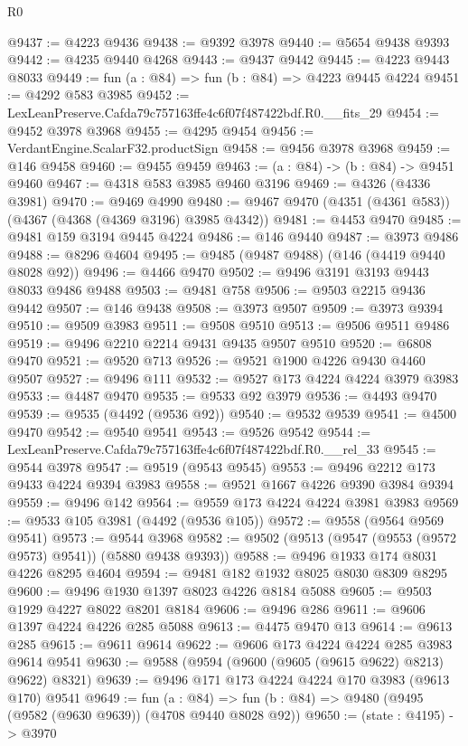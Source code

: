 \begin{lexlean}{R0}
\begin{coremodule}
@9437 := @4223 @9436
@9438 := @9392 @3978
@9440 := @5654 @9438 @9393
@9442 := @4235 @9440 @4268
@9443 := @9437 @9442
@9445 := @4223 @9443 @8033
@9449 := fun (a : @84) => fun (b : @84) => @4223 @9445 @4224
@9451 := @4292 @583 @3985
@9452 := LexLeanPreserve.Cafda79c757163ffe4c6f07f487422bdf.R0.__fits_29
@9454 := @9452 @3978 @3968
@9455 := @4295 @9454
@9456 := VerdantEngine.ScalarF32.productSign
@9458 := @9456 @3978 @3968
@9459 := @146 @9458
@9460 := @9455 @9459
@9463 := (a : @84) -> (b : @84) -> @9451 @9460
@9467 := @4318 @583 @3985 @9460 @3196
@9469 := @4326 (@4336 @3981)
@9470 := @9469 @4990
@9480 := @9467 @9470 (@4351 (@4361 @583)) (@4367 (@4368 (@4369 @3196) @3985 @4342))
@9481 := @4453 @9470
@9485 := @9481 @159 @3194 @9445 @4224
@9486 := @146 @9440
@9487 := @3973 @9486
@9488 := @8296 @4604
@9495 := @9485 (@9487 @9488) (@146 (@4419 @9440 @8028 @92))
@9496 := @4466 @9470
@9502 := @9496 @3191 @3193 @9443 @8033 @9486 @9488
@9503 := @9481 @758
@9506 := @9503 @2215 @9436 @9442
@9507 := @146 @9438
@9508 := @3973 @9507
@9509 := @3973 @9394
@9510 := @9509 @3983
@9511 := @9508 @9510
@9513 := @9506 @9511 @9486
@9519 := @9496 @2210 @2214 @9431 @9435 @9507 @9510
@9520 := @6808 @9470
@9521 := @9520 @713
@9526 := @9521 @1900 @4226 @9430 @4460 @9507
@9527 := @9496 @111
@9532 := @9527 @173 @4224 @4224 @3979 @3983
@9533 := @4487 @9470
@9535 := @9533 @92 @3979
@9536 := @4493 @9470
@9539 := @9535 (@4492 (@9536 @92))
@9540 := @9532 @9539
@9541 := @4500 @9470
@9542 := @9540 @9541
@9543 := @9526 @9542
@9544 := LexLeanPreserve.Cafda79c757163ffe4c6f07f487422bdf.R0.__rel_33
@9545 := @9544 @3978
@9547 := @9519 (@9543 @9545)
@9553 := @9496 @2212 @173 @9433 @4224 @9394 @3983
@9558 := @9521 @1667 @4226 @9390 @3984 @9394
@9559 := @9496 @142
@9564 := @9559 @173 @4224 @4224 @3981 @3983
@9569 := @9533 @105 @3981 (@4492 (@9536 @105))
@9572 := @9558 (@9564 @9569 @9541)
@9573 := @9544 @3968
@9582 := @9502 (@9513 (@9547 (@9553 (@9572 @9573) @9541)) (@5880 @9438 @9393))
@9588 := @9496 @1933 @174 @8031 @4226 @8295 @4604
@9594 := @9481 @182 @1932 @8025 @8030 @8309 @8295
@9600 := @9496 @1930 @1397 @8023 @4226 @8184 @5088
@9605 := @9503 @1929 @4227 @8022 @8201 @8184
@9606 := @9496 @286
@9611 := @9606 @1397 @4224 @4226 @285 @5088
@9613 := @4475 @9470 @13
@9614 := @9613 @285
@9615 := @9611 @9614
@9622 := @9606 @173 @4224 @4224 @285 @3983 @9614 @9541
@9630 := @9588 (@9594 (@9600 (@9605 (@9615 @9622) @8213) @9622) @8321)
@9639 := @9496 @171 @173 @4224 @4224 @170 @3983 (@9613 @170) @9541
@9649 := fun (a : @84) =>
  fun (b : @84) => @9480 (@9495 (@9582 (@9630 @9639)) (@4708 @9440 @8028 @92))
@9650 := (state : @4195) -> @3970

\end{coremodule}
\end{lexlean}
